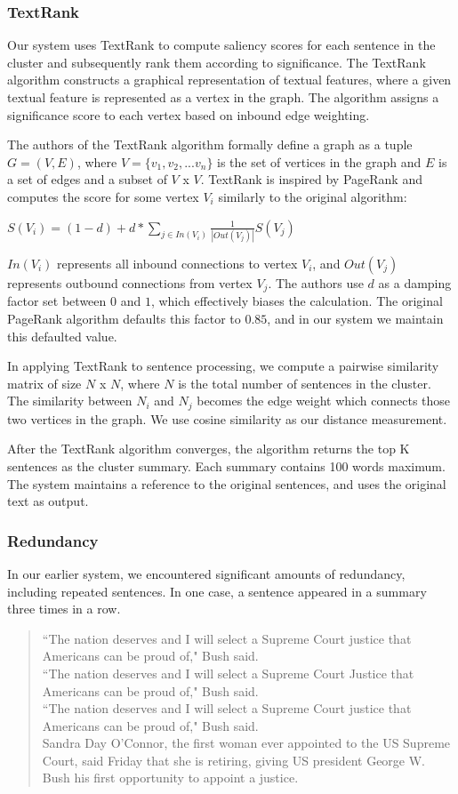 \documentclass[11pt]{article}
\begin{document}
\subsubsection{TextRank}
Our system uses TextRank to compute saliency scores for each sentence in the cluster and subsequently rank them according to significance. The TextRank algorithm constructs a graphical representation of textual features, where a given textual feature is represented as a vertex in the graph. The algorithm assigns a significance score to each vertex based on inbound edge weighting.

The authors of the TextRank algorithm formally define a graph as a tuple $G = (V,E)$, where $V = \{v_1, v_2, ... v_n\}$ is the set of vertices in the graph and $E$ is a set of edges and a subset of $V$ x $V$. TextRank is inspired by PageRank and computes the score for some vertex $V_i$ similarly to the original algorithm:
\begin{center}
    $S(V_i) = (1 - d) + d * \sum_{j \in In(V_i)} \frac{1}{|Out(V_j)|}S(V_j)$
\end{center}
$In(V_i)$ represents all inbound connections to vertex $V_i$, and $Out(V_j)$ represents outbound connections from vertex $V_j$. The authors use $d$ as a damping factor set between $0$ and $1$, which effectively biases the calculation. The original PageRank algorithm defaults this factor to $0.85$, and in our system we maintain this defaulted value.

In applying TextRank to sentence processing, we compute a pairwise similarity matrix of size $N$ x $N$, where $N$ is the total number of sentences in the cluster. The similarity between $N_i$ and $N_j$ becomes the edge weight which connects those two vertices in the graph. We use cosine similarity as our distance measurement.

After the TextRank algorithm converges, the algorithm returns the top K sentences as the cluster summary. Each summary contains 100 words maximum. The system maintains a 
reference to the original sentences, and uses the original text as output.

\subsubsection{Redundancy}
In our earlier system, we encountered significant amounts of redundancy, including repeated sentences. In one case, a sentence appeared in a summary three times in a row. 

\begin{quote}
``The nation deserves and I will select a Supreme Court justice that Americans can be proud of," Bush said.\\
``The nation deserves and I will select a Supreme Court Justice that Americans can be proud of," Bush said.\\
``The nation deserves and I will select a Supreme Court justice that Americans can be proud of," Bush said.\\
Sandra Day O'Connor, the first  woman ever appointed to the US Supreme Court, said Friday that she is retiring, giving US president George W. Bush his first  opportunity to appoint a justice.
\end{quote}
\end{document}
